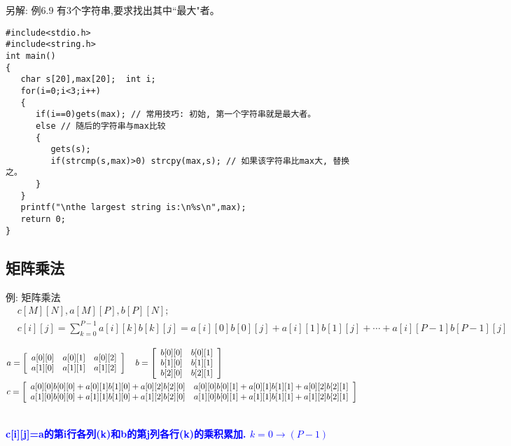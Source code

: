 \begin{frame}{\small{另解: 例6.9 有3个字符串,要求找出其中``最大"者。}}
\begin{lstlisting}
#include<stdio.h>
#include<string.h>
int main()                   
{  
   char s[20],max[20];  int i;
   for(i=0;i<3;i++)
   {
      if(i==0)gets(max); // 常用技巧: 初始, 第一个字符串就是最大者。
      else // 随后的字符串与max比较
      {
         gets(s);
         if(strcmp(s,max)>0) strcpy(max,s); // 如果该字符串比max大, 替换之。
      }
   }
   printf("\nthe largest string is:\n%s\n",max);
   return 0;           
}
\end{lstlisting}
\end{frame}  

\subsection{矩阵乘法}

\begin{frame}{例: 矩阵乘法}
\vspace{-0.4cm}
\begin{align*}
&c[M][N],a[M][P],b[P][N];\\ &c[i][j]=\sum_{k=0}^{P-1}a[i][k]b[k][j]=a[i][0]b[0][j]+a[i][1]b[1][j]+\cdots +a[i][P-1]b[P-1][j]
\end{align*}
\begin{scriptsize}
\begin{align*}
&a=\left[\begin{array}[l]{ccc}
a[0][0] & a[0][1] & a[0][2]\\
a[1][0] & a[1][1] & a[1][2]
\end{array}
\right]\quad
b=\left[\begin{array}[l]{ccc}
b[0][0] & b[0][1] \\
b[1][0] & b[1][1] \\
b[2][0] & b[2][1]
\end{array}
\right]\\
&c=\left[\begin{array}[l]{ccc}
a[0][0]b[0][0]+a[0][1]b[1][0]+a[0][2]b[2][0] & a[0][0]b[0][1]+a[0][1]b[1][1]+a[0][2]b[2][1] \\
a[1][0]b[0][0]+a[1][1]b[1][0]+a[1][2]b[2][0] & a[1][0]b[0][1]+a[1][1]b[1][1]+a[1][2]b[2][1]
\end{array}
\right]
\end{align*}
\end{scriptsize}
\\
\pause
\bigskip
\textbf{\textcolor{blue}{c[i][j]=a的第i行各列(k)和b的第j列各行(k)的乘积累加. $k=0\to(P-1)$}}
\end{frame}

